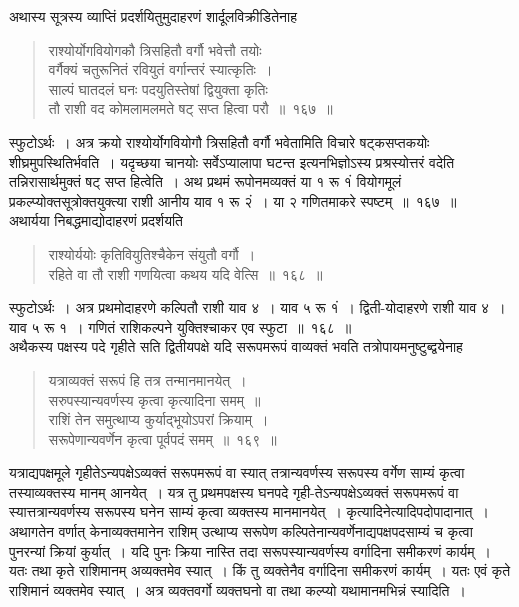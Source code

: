\documentclass[11pt, openany]{book}
\begin{document}
\vspace{-2mm}
 अथास्य सूत्रस्य व्याप्तिं प्रदर्शयितुमुदाहरणं शार्दूलविक्रीडितेनाह\textendash
 \begin{quote}
     \eg 
     राश्योर्योगवियोगकौ त्रिसहितौ वर्गौ भवेत्तौ तयोः \\
 वर्गैक्यं चतुरूनितं रवियुतं वर्गान्तरं स्यात्कृतिः~। \\
 साल्पं घातदलं घनः पदयुतिस्तेषां द्वियुक्ता कृतिः \\
 तौ राशी वद कोमलामलमते षट् सप्त हित्वा परौ~॥~१६७~॥
 \end{quote}
 
 स्फुटोऽर्थः~। अत्र क्रयो राश्योर्योगवियोगौ त्रिसहितौ वर्गौ भवेतामिति
विचारे षट्कसप्तकयोः शीघ्रमुपस्थितिर्भवति~। यदृच्छया चानयोः सर्वेऽप्यालापा
घटन्त इत्यनभिज्ञोऽस्य प्रश्रस्योत्तरं वदेति तन्निरासार्थमुक्तं षट् सप्त
हित्वेति~।
 अथ प्रथमं रूपोनमव्यक्तं या १ रू १ं वियोगमूलं
प्रकल्प्योक्तसूत्रोक्तयुक्त्या राशी 
आनीय याव १ रू २ं~। या २ गणितमाकरे स्पष्टम्~॥~१६७~॥~\\

\vspace{-2mm}
 अथार्यया निबद्धमाद्योदाहरणं प्रदर्शयति\textendash
\begin{quote}
    \eg 
     राश्योर्ययोः कृतिवियुतिश्चैकेन संयुतौ वर्गौ~।\\
 रहिते वा तौ राशी गणयित्वा कथय यदि वेत्सि~॥~१६८~॥~\\

\end{quote}
\newpage
 स्फुटोऽर्थः~। अत्र प्रथमोदाहरणे कल्पितौ राशी याव ४~। याव ५ रू १ं~। 
द्विती-योदाहरणे राशी याव ४~। याव ५ रू १~। गणितं राशिकल्पने
युक्तिश्चाकर एव स्फुटा~॥~१६८~॥\\

\vspace{-2mm}
 अथैकस्य पक्षस्य पदे गृहीते सति द्वितीयपक्षे यदि सरूपमरूपं वाव्यक्तं
भवति तत्रोपायमनुष्टुब्द्वयेनाह\textendash 

 \label{169}
\begin{quote}
   \ab
     यत्राव्यक्तं सरूपं हि तत्र तन्मानमानयेत्~। \\
 सरुपस्यान्यवर्णस्य कृत्वा कृत्यादिना समम्~॥~\\
 राशिं तेन समुत्थाप्य कुर्याद्भूयोऽपरां क्रियाम्~। \\
 सरूपेणान्यवर्णेन कृत्वा पूर्वपदं समम्~॥~१६९~॥~
\end{quote}
 
 यत्राद्यपक्षमूले गृहीतेऽन्यपक्षेऽव्यक्तं सरूपमरूपं वा
स्यात् तत्रान्यवर्णस्य 
सरूपस्य वर्गेण साम्यं कृत्वा तस्याव्यक्तस्य मानम् आनयेत्~। यत्र तु
प्रथमपक्षस्य घनपदे
 गृही-तेऽन्यपक्षेऽव्यक्तं सरूपमरूपं वा स्यात्तत्रान्यवर्णस्य सरूपस्य
घनेन साम्यं कृत्वा
 व्यक्तस्य मानमानयेत्~। कृत्यादिनेत्यादिपदोपादानात्~। अथागतेन वर्णात्
केनाव्यक्तमानेन राशिम् उत्थाप्य सरूपेण कल्पितेनान्यवर्णेनाद्यपक्षपदसाम्यं च
कृत्वा पुनरन्यां क्रियां कुर्यात्~। यदि पुनः क्रिया नास्ति तदा
सरूपस्यान्यवर्णस्य
 वर्गादिना समीकरणं कार्यम्~। यतः तथा कृते राशिमानम् अव्यक्तमेव स्यात्~।
 किं तु व्यक्तेनैव वर्गादिना समीकरणं कार्यम्~। यतः एवं कृते
राशिमानं व्यक्तमेव स्यात्~। अत्र व्यक्तवर्गो व्यक्तघनो वा तथा कल्प्यो
यथामानमभिन्नं स्यादिति~। \\
\end{document}
